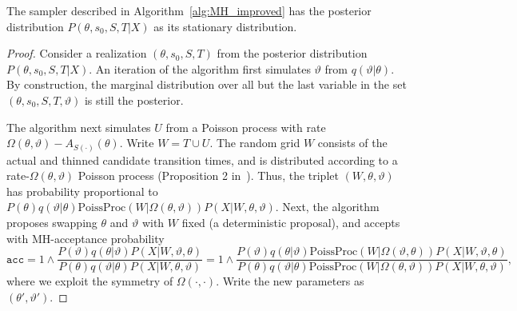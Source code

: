 \begin{proposition}
  The sampler described in Algorithm~\ref{alg:MH_improved} has the posterior distribution $P(\theta,s_0,S,T|X)$ as its stationary distribution.
\end{proposition}
\begin{proof}
  Consider a realization $(\theta,s_0,S,T)$ from the posterior distribution $P(\theta, s_0, S, T|X)$. An iteration of the algorithm first simulates $\vartheta$ from $q(\vartheta|\theta)$. By construction, the marginal distribution over all but the last variable in the set $(\theta, s_0, S, T, \vartheta)$ is still the posterior.

  The algorithm next simulates $U$ from a Poisson process with rate $\Omega(\theta,\vartheta) - A_{S(\cdot)}(\theta)$. Write $W = T \cup U$.
  The random grid $W$ consists of the actual and thinned candidate transition times, and is distributed according to a rate-$\Omega(\theta, \vartheta)$ Poisson process (Proposition 2 in~\cite{RaoTeh13}). 
  Thus, the triplet $(W,\theta,\vartheta)$ has probability proportional to $P(\theta)q(\vartheta|\theta)\text{PoissProc}(W|\Omega(\theta,\vartheta)) P(X|W,\theta,\vartheta)$.
  Next, the algorithm proposes swapping $\theta$ and $\vartheta$ with $W$ fixed (a deterministic proposal), and accepts with MH-acceptance probability 
  $$\texttt{acc} = 
  1 \wedge \frac{P(\vartheta)q(\theta|\vartheta)
P(X|W,\vartheta,\theta)}{P(\theta)q(\vartheta|\theta)
P(X|W,\theta,\vartheta)} =
1 \wedge \frac{P(\vartheta)q(\theta|\vartheta)\text{PoissProc}(W|\Omega(\vartheta,\theta)) P(X|W,\vartheta,\theta)}{P(\theta)q(\vartheta|\theta)\text{PoissProc}(W|\Omega(\theta,\vartheta))
P(X|W,\theta,\vartheta)},$$
where we exploit the symmetry of $\Omega(\cdot,\cdot)$.
Write the new parameters as $(\theta', \vartheta')$. 


\end{proof}
